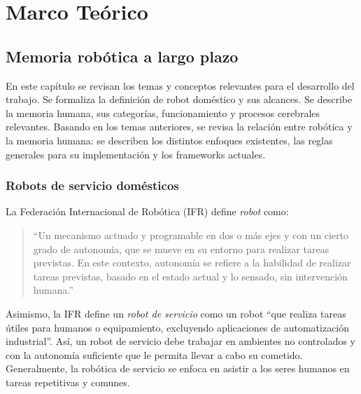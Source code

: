 \chapter{Marco Teórico}\label{chapter:theory}


\section{Memoria robótica a largo plazo}\label{chapter:memory}

En este capítulo se revisan los temas y conceptos relevantes para el desarrollo del trabajo. Se formaliza la definición de robot doméstico y sus alcances. Se describe la memoria humana, sus categorías, funcionamiento y procesos cerebrales relevantes. Basando en los temas anteriores, se revisa la relación entre robótica y la memoria humana: se describen los distintos enfoques existentes, las reglas generales para su implementación y los frameworks actuales.


\subsection{Robots de servicio domésticos}\label{sec:domestic_robots}

La Federación Internacional de Robótica (IFR) \cite{IFR} define \textit{robot} como:
\begin{quotation}
	``Un mecanismo actuado y programable en dos o más ejes y con un cierto grado de autonomía, que se mueve en su entorno para realizar tareas previstas. En este contexto, autonomía se refiere a la habilidad de realizar tareas previstas, basado en el estado actual y lo sensado, sin intervención humana.''
\end{quotation}

Asimismo, la IFR define un \textit{robot de servicio} como un robot ``que realiza tareas útiles para humanos o equipamiento, excluyendo aplicaciones de automatización industrial''. Así, un robot de servicio debe trabajar en ambientes no controlados y con la autonomía suficiente que le permita llevar a cabo su cometido. Generalmente, la robótica de servicio se enfoca en asistir a los seres humanos en tareas repetitivas y comunes.

